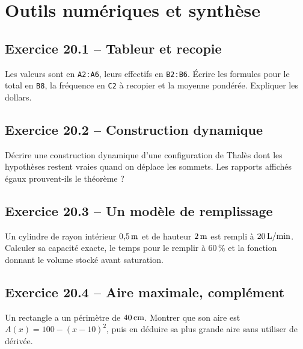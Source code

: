 \chapter{Outils numériques et synthèse}
\label{exercices:20}
\section*{Exercice 20.1 -- Tableur et recopie}
Les valeurs sont en \texttt{A2:A6}, leurs effectifs en \texttt{B2:B6}. Écrire les formules pour le total en \texttt{B8}, la fréquence en \texttt{C2} à recopier et la moyenne pondérée. Expliquer les dollars.

\section*{Exercice 20.2 -- Construction dynamique}
Décrire une construction dynamique d'une configuration de Thalès dont les hypothèses restent vraies quand on déplace les sommets. Les rapports affichés égaux prouvent-ils le théorème ?

\section*{Exercice 20.3 -- Un modèle de remplissage}
Un cylindre de rayon intérieur $0{,}5\,\mathrm{m}$ et de hauteur $2\,\mathrm{m}$ est rempli à $20\,\mathrm{L/min}$. Calculer sa capacité exacte, le temps pour le remplir à $60\,\%$ et la fonction donnant le volume stocké avant saturation.

\section*{Exercice 20.4 -- Aire maximale, complément}
Un rectangle a un périmètre de $40\,\mathrm{cm}$. Montrer que son aire est $A(x)=100-(x-10)^2$, puis en déduire sa plus grande aire sans utiliser de dérivée.
